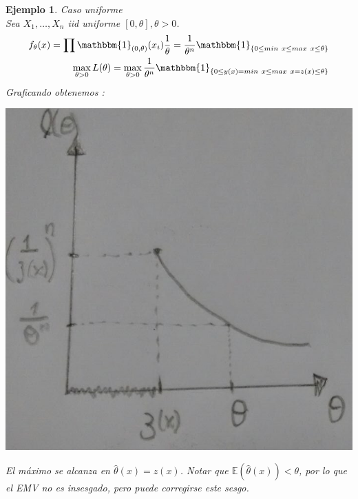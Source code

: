 \documentclass[10pt]{article}
\theoremstyle{plain}
\newtheorem{ej}{Ejemplo}
\theoremstyle{definition}
\begin{document}
\begin{ej} Caso uniforme\\
Sea $X_{1},\ldots,X_{n}$ iid uniforme $\left[0,\theta\right], \theta > 0$.\\
\begin{align*}
f_{\theta}(x) = \prod \mathbbm{1}_{(0,\theta)}(x_{i})\frac{1}{\theta} = \frac{1}{\theta^n}\mathbbm{1}_{\{0 \le min\ x \le max\ x \le \theta\}}\\
\max_{\theta > 0} L(\theta) = \max_{\theta > 0} \frac{1}{\theta^n}\mathbbm{1}_{\{0 \le y(x) =  min\ x \le max\ x = z(x) \le \theta\}}
\end{align*}
Graficando obtenemos :\\
\begin{center}
\includegraphics[scale=0.2]{imagenes/emv_uniforme.png}
\end{center}
El máximo se alcanza en $\hat{\theta}(x) = z(x)$. Notar que $\mathbb{E}(\hat{\theta}(x)) < \theta$, por lo que el EMV no es insesgado, pero puede corregirse este sesgo.
\end{ej}
\end{document}

